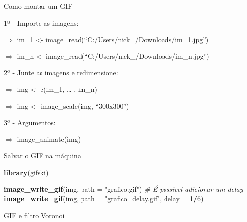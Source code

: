 \documentclass[
  ignorenonframetext,
]{beamer}
\newenvironment{Shaded}{\begin{snugshade}}{\end{snugshade}}
\newcommand{\CommentTok}[1]{\textcolor[rgb]{0.56,0.35,0.01}{\textit{#1}}}
\newcommand{\DataTypeTok}[1]{\textcolor[rgb]{0.13,0.29,0.53}{#1}}
\newcommand{\DecValTok}[1]{\textcolor[rgb]{0.00,0.00,0.81}{#1}}
\newcommand{\KeywordTok}[1]{\textcolor[rgb]{0.13,0.29,0.53}{\textbf{#1}}}
\newcommand{\NormalTok}[1]{#1}
\newcommand{\OperatorTok}[1]{\textcolor[rgb]{0.81,0.36,0.00}{\textbf{#1}}}
\newcommand{\StringTok}[1]{\textcolor[rgb]{0.31,0.60,0.02}{#1}}
\begin{document}
\begin{frame}{Como montar um GIF}
\protect\hypertarget{como-montar-um-gif}{}

1º - Importe as imagens:

\(\Rightarrow\) im\_1 \textless-
image\_read(``C:/Users/nick\_/Downloads/im\_1.jpg'')

\(\Rightarrow\) im\_n \textless-
image\_read(``C:/Users/nick\_/Downloads/im\_n.jpg'')

2º - Junte as imagens e redimensione:

\(\Rightarrow\) img \textless- c(im\_1, \ldots{} , im\_n)

\(\Rightarrow\) img \textless- image\_scale(img, ``300x300'')

3º - Argumentos:

\(\Rightarrow\) image\_animate(img)

\end{frame}

\begin{frame}[fragile]{Salvar o GIF na máquina}
\protect\hypertarget{salvar-o-gif-na-muxe1quina}{}

\begin{Shaded}
\begin{Highlighting}[]
\KeywordTok{library}\NormalTok{(gifski)}

\KeywordTok{image_write_gif}\NormalTok{(img, }\DataTypeTok{path =} \StringTok{"grafico.gif"}\NormalTok{)}
 \CommentTok{# É possivel adicionar um delay}
\KeywordTok{image_write_gif}\NormalTok{(img, }\DataTypeTok{path =} \StringTok{"grafico_delay.gif"}\NormalTok{,}
                \DataTypeTok{delay =} \DecValTok{1}\OperatorTok{/}\DecValTok{6}\NormalTok{)}
\end{Highlighting}
\end{Shaded}

\end{frame}

\begin{frame}[fragile]{GIF e filtro Voronoi}
\protect\hypertarget{gif-e-filtro-voronoi}{}

\small

\begin{Shaded}
\end{Shaded}

\end{frame}
\end{document}
